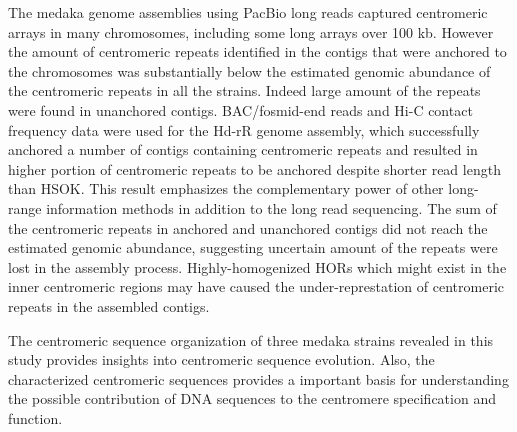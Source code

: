 The medaka genome assemblies using PacBio long reads captured centromeric arrays in many chromosomes, including some long arrays over 100 kb. However the amount of centromeric repeats identified in the contigs that were anchored to the chromosomes was substantially below the estimated genomic abundance of the centromeric repeats in all the strains. Indeed large amount of the repeats were found in unanchored contigs. BAC/fosmid-end reads and Hi-C contact frequency data were used for the Hd-rR genome assembly, which successfully anchored a number of contigs containing centromeric repeats and resulted in higher portion of centromeric repeats to be anchored despite shorter read length than HSOK. This result emphasizes the complementary power of other long-range information methods in addition to the long read sequencing. The sum of the centromeric repeats in anchored and unanchored contigs did not reach the estimated genomic abundance, suggesting uncertain amount of the repeats were lost in the assembly process. Highly-homogenized HORs which might exist in the inner centromeric regions may have caused the under-represtation of centromeric repeats in the assembled contigs.

The centromeric sequence organization of three medaka strains revealed in this study provides insights into centromeric sequence evolution. Also, the characterized centromeric sequences provides a important basis for understanding the possible contribution of DNA sequences to the centromere specification and function.
